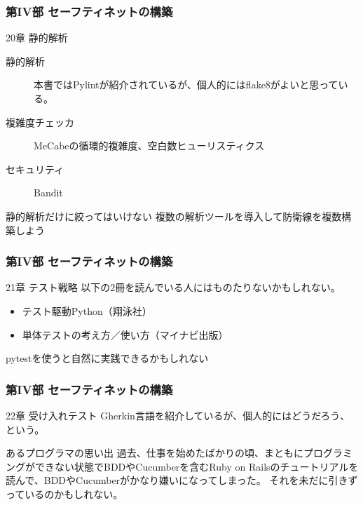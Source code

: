 \documentclass[aspectratio=169,dvipdfmx,14pt,notheorems]{beamer}
\theoremstyle{definition}
\begin{document}
\begin{frame}\frametitle{第IV部 セーフティネットの構築}

\begin{block}{20章 静的解析}
\begin{description}
\item[静的解析] 本書ではPylintが紹介されているが、個人的にはflake8がよいと思っている。
\item[複雑度チェッカ] MeCabeの循環的複雑度、空白数ヒューリスティクス
\item[セキュリティ] Bandit
\end{description}

\end{block}

\begin{alertblock}{静的解析だけに絞ってはいけない}
複数の解析ツールを導入して防衛線を複数構築しよう
\end{alertblock}

\end{frame}

\begin{frame}\frametitle{第IV部 セーフティネットの構築}

\begin{block}{21章 テスト戦略}
以下の2冊を読んでいる人にはものたりないかもしれない。
\begin{itemize}
\item テスト駆動Python（翔泳社）
\item 単体テストの考え方／使い方（マイナビ出版）
\end{itemize}
pytestを使うと自然に実践できるかもしれない
\end{block}

\end{frame}

\begin{frame}\frametitle{第IV部 セーフティネットの構築}

\begin{block}{22章 受け入れテスト}
Gherkin言語を紹介しているが、個人的にはどうだろう、という。
\end{block}

\begin{alertblock}{あるプログラマの思い出}
過去、仕事を始めたばかりの頃、まともにプログラミングができない状態でBDDやCucumberを含むRuby on Railsのチュートリアルを読んで、BDDやCucumberがかなり嫌いになってしまった。
それを未だに引きずっているのかもしれない。
\end{alertblock}
\end{frame}
\end{document}
